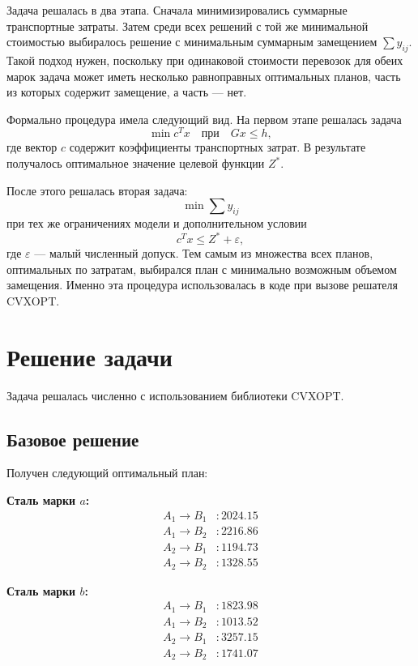\documentclass[a4paper,12pt]{article}
\begin{document}
Задача решалась в два этапа. Сначала минимизировались суммарные транспортные
затраты. Затем среди всех решений с той же минимальной стоимостью выбиралось
решение с минимальным суммарным замещением $\sum y_{ij}$. Такой подход нужен,
поскольку при одинаковой стоимости перевозок для обеих марок задача может иметь
несколько равноправных оптимальных планов, часть из которых содержит замещение,
а часть --- нет.

Формально процедура имела следующий вид. На первом этапе решалась задача
\[
\min c^T x \quad \text{при} \quad Gx \le h,
\]
где вектор $c$ содержит коэффициенты транспортных затрат. В результате
получалось оптимальное значение целевой функции $Z^*$.

После этого решалась вторая задача:
\[
\min \sum y_{ij}
\]
при тех же ограничениях модели и дополнительном условии
\[
c^T x \le Z^* + \varepsilon,
\]
где $\varepsilon$ --- малый численный допуск. Тем самым из множества всех
планов, оптимальных по затратам, выбирался план с минимально возможным
объемом замещения. Именно эта процедура использовалась в коде при вызове
решателя CVXOPT.

\section{Решение задачи}

Задача решалась численно с использованием библиотеки CVXOPT.

\subsection{Базовое решение}

Получен следующий оптимальный план:

\textbf{Сталь марки $a$:}
\[
\begin{aligned}
A_1 \to B_1 &: 2024.15 \\
A_1 \to B_2 &: 2216.86 \\
A_2 \to B_1 &: 1194.73 \\
A_2 \to B_2 &: 1328.55
\end{aligned}
\]

\textbf{Сталь марки $b$:}
\[
\begin{aligned}
A_1 \to B_1 &: 1823.98 \\
A_1 \to B_2 &: 1013.52 \\
A_2 \to B_1 &: 3257.15 \\
A_2 \to B_2 &: 1741.07
\end{aligned}
\]
\end{document}
